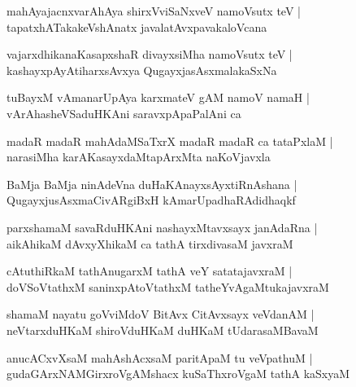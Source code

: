 \documentclass[twoside,12pt,openright]{book}
\newcounter{shloka}[chapter]
\begin{document}
\begin{shloka}%
mahAyajacnxvarAhAya shirxVviSaNxveV namoVsutx teV |\\
tapatxhATakakeVshAnatx javalatAvxpavakaloVcana 
\end{shloka}

\begin{shloka}%
vajarxdhikanaKasapxshaR divayxsiMha namoVsutx teV |\\
kashayxpAyAtiharxsAvxya QugayxjasAsxmalakaSxNa
\end{shloka}

\begin{shloka}%
tuBayxM vAmanarUpAya karxmateV gAM namoV namaH |\\
vArAhasheVSaduHKAni saravxpApaPalAni ca 
\end{shloka}

\begin{shloka}%
madaR madaR mahAdaMSaTxrX madaR madaR ca tataPxlaM |\\
narasiMha karAKasayxdaMtapArxMta naKoVjavxla 
\end{shloka}

\begin{shloka}%
BaMja BaMja ninAdeVna duHaKAnayxsAyxtiRnAshana |\\
QugayxjusAsxmaCivARgiBxH kAmarUpadhaRAdidhaqkf 
\end{shloka}

\begin{shloka}%
parxshamaM savaRduHKAni nashayxMtavxsayx janAdaRna |\\
aikAhikaM dAvxyXhikaM ca tathA tirxdivasaM javxraM 
\end{shloka}

\begin{shloka}%
cAtuthiRkaM tathAnugarxM tathA veY satatajavxraM |\\
doVSoVtathxM saninxpAtoVtathxM tatheYvAgaMtukajavxraM 
\end{shloka}

\begin{shloka}%
shamaM nayatu goVviMdoV BitAvx CitAvxsayx veVdanAM |\\
neVtarxduHKaM shiroVduHKaM duHKaM tUdarasaMBavaM 
\end{shloka}

\begin{shloka}%
anucACxvXsaM mahAshAcxsaM paritApaM tu veVpathuM |\\
gudaGArxNAMGirxroVgAMshacx kuSaThxroVgaM tathA kaSxyaM 
\end{shloka}
\end{document}
